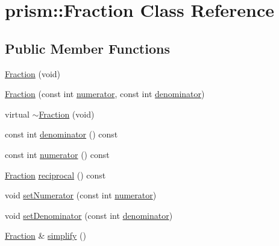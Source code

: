 \hypertarget{classprism_1_1_fraction}{}\section{prism\+:\+:Fraction Class Reference}
\label{classprism_1_1_fraction}
\subsection*{Public Member Functions}
\begin{DoxyCompactItemize}
\item 
\hyperlink{classprism_1_1_fraction_ae66446d8d2130582811d17e547dd25e4}{Fraction} (void)
\item 
\hyperlink{classprism_1_1_fraction_ae6458e0578c2ddd59ce718b7808ca0ec}{Fraction} (const int \hyperlink{classprism_1_1_fraction_a1991d357549c20236a7e3008ddcc10a7}{numerator}, const int \hyperlink{classprism_1_1_fraction_af0f39f599394258c248f375c88e9c9d4}{denominator})
\item 
virtual \hyperlink{classprism_1_1_fraction_a4aca65c4a95dbfbe0c6c0588782f4813}{$\sim$\+Fraction} (void)
\item 
const int \hyperlink{classprism_1_1_fraction_af0f39f599394258c248f375c88e9c9d4}{denominator} () const 
\item 
const int \hyperlink{classprism_1_1_fraction_a1991d357549c20236a7e3008ddcc10a7}{numerator} () const 
\item 
\hyperlink{classprism_1_1_fraction}{Fraction} \hyperlink{classprism_1_1_fraction_aab12f13967ca16e8956618f9d0641c31}{reciprocal} () const 
\item 
void \hyperlink{classprism_1_1_fraction_aeaa287cd1b228f2038b13e2bd54d5c96}{set\+Numerator} (const int \hyperlink{classprism_1_1_fraction_a1991d357549c20236a7e3008ddcc10a7}{numerator})
\item 
void \hyperlink{classprism_1_1_fraction_ac4ab0a9b891910381813f16ebc0261fa}{set\+Denominator} (const int \hyperlink{classprism_1_1_fraction_af0f39f599394258c248f375c88e9c9d4}{denominator})
\item 
\hyperlink{classprism_1_1_fraction}{Fraction} \& \hyperlink{classprism_1_1_fraction_a475407e9d049019e4de6b700ef196ef7}{simplify} ()
\end{DoxyCompactItemize}

